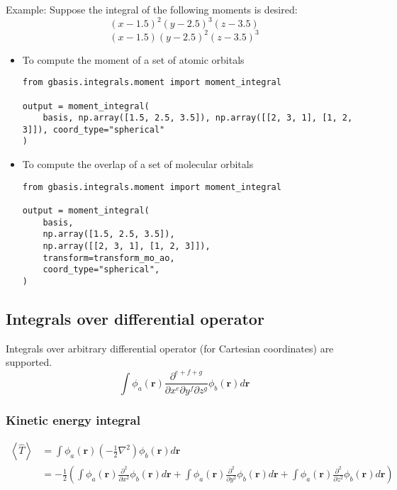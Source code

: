 \documentclass[letterpaper]{article}
\begin{document}
Example:
Suppose the integral of the following moments is desired:
\begin{equation}
  (x - 1.5)^2 (y - 2.5)^3 (z - 3.5)
\end{equation}
\begin{equation}
  (x - 1.5) (y - 2.5)^2 (z - 3.5)^3
\end{equation}
\begin{itemize}
\item To compute the moment of a set of atomic orbitals
  \begin{lstlisting}[xleftmargin=-25pt]
from gbasis.integrals.moment import moment_integral

output = moment_integral(
    basis, np.array([1.5, 2.5, 3.5]), np.array([[2, 3, 1], [1, 2, 3]]), coord_type="spherical"
)
\end{lstlisting}
\item To compute the overlap of a set of molecular orbitals
  \begin{lstlisting}[xleftmargin=-25pt]
from gbasis.integrals.moment import moment_integral

output = moment_integral(
    basis,
    np.array([1.5, 2.5, 3.5]),
    np.array([[2, 3, 1], [1, 2, 3]]),
    transform=transform_mo_ao,
    coord_type="spherical",
)
\end{lstlisting}
\end{itemize}

\subsection{Integrals over differential operator}
Integrals over arbitrary differential operator (for Cartesian coordinates) are
supported.
\begin{equation}
  \int
  \phi_a(\mathbf{r}) \frac{\partial^{e+f+g}}{\partial x^e \partial y^f \partial z^g} \phi_b(\mathbf{r})
  d\mathbf{r}
\end{equation}

\subsubsection{Kinetic energy integral}
\begin{equation}
  \label{eq:kinetic_energy}
  \begin{split}
    \left< \hat{T} \right>
    &= \int \phi_a(\mathbf{r}) \left( -\frac{1}{2} \nabla^2 \right) \phi_b(\mathbf{r}) d\mathbf{r}\\
    &= -\frac{1}{2}
    \left(
      \int \phi_a(\mathbf{r}) \frac{\partial^2}{\partial x^2} \phi_b(\mathbf{r}) d\mathbf{r}
      + \int \phi_a(\mathbf{r}) \frac{\partial^2}{\partial y^2} \phi_b(\mathbf{r}) d\mathbf{r}
      + \int \phi_a(\mathbf{r}) \frac{\partial^2}{\partial z^2} \phi_b(\mathbf{r}) d\mathbf{r}
    \right)
  \end{split}
\end{equation}
\end{document}
